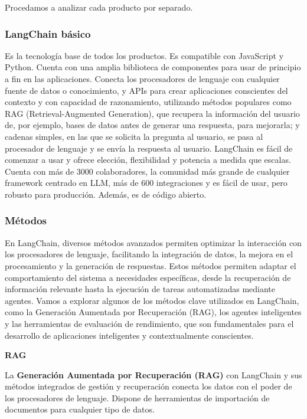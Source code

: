 Procedamos a analizar cada producto por separado.


\subsubsection{LangChain básico}

Es la tecnología base de todos los productos. Es compatible con JavaScript y Python. Cuenta con una amplia biblioteca de componentes para usar de principio a fin en las aplicaciones. Conecta los procesadores de lenguaje con cualquier fuente de datos o conocimiento, y APIs para crear aplicaciones conscientes del contexto y con capacidad de razonamiento, utilizando métodos populares como RAG (Retrieval-Augmented Generation), que recupera la información del usuario de, por ejemplo, bases de datos antes de generar una respuesta, para mejorarla; y cadenas simples, en las que se solicita la pregunta al usuario, se pasa al procesador de lenguaje y se envía la respuesta al usuario. LangChain es fácil de comenzar a usar y ofrece elección, flexibilidad y potencia a medida que escalas. Cuenta con más de 3000 colaboradores, la comunidad más grande de cualquier framework centrado en LLM, más de 600 integraciones y es fácil de usar, pero robusto para producción. Además, es de código abierto. \cite{PaginaLangChainOficialBasico}


\subsubsection{Métodos}

En LangChain, diversos métodos avanzados permiten optimizar la interacción con los procesadores de lenguaje, facilitando la integración de datos, la mejora en el procesamiento y la generación de respuestas. Estos métodos permiten adaptar el comportamiento del sistema a necesidades específicas, desde la recuperación de información relevante hasta la ejecución de tareas automatizadas mediante agentes. Vamos a explorar algunos de los métodos clave utilizados en LangChain, como la Generación Aumentada por Recuperación (RAG), los agentes inteligentes y las herramientas de evaluación de rendimiento, que son fundamentales para el desarrollo de aplicaciones inteligentes y contextualmente conscientes.

\textbf{RAG}

La \textbf{Generación Aumentada por Recuperación (RAG)} con LangChain y sus métodos integrados de gestión y recuperación conecta los datos con el poder de los procesadores de lenguaje. Dispone de herramientas de importación de documentos para cualquier tipo de datos.

